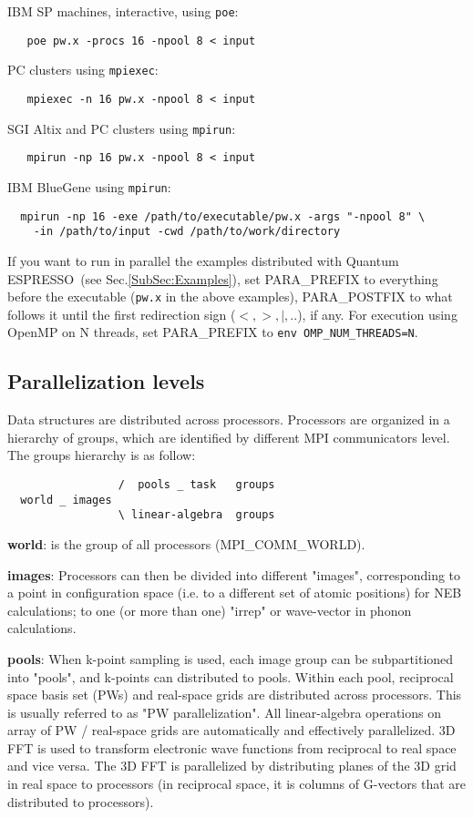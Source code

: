\documentclass[12pt,a4paper]{article}
\def\qe{{\sc Quantum ESPRESSO}}
\def\pw.x{\texttt{pw.x}}
\begin{document}
IBM SP machines, interactive, using \texttt{poe}:
\begin{verbatim}
   poe pw.x -procs 16 -npool 8 < input
\end{verbatim}
PC clusters using \texttt{mpiexec}:
\begin{verbatim}
   mpiexec -n 16 pw.x -npool 8 < input
\end{verbatim}
SGI Altix and PC clusters using \texttt{mpirun}:
\begin{verbatim}   mpirun -np 16 pw.x -npool 8 < input
\end{verbatim}
IBM BlueGene using \texttt{mpirun}:
 \begin{verbatim}
  mpirun -np 16 -exe /path/to/executable/pw.x -args "-npool 8" \
    -in /path/to/input -cwd /path/to/work/directory
\end{verbatim}
If you want to run in parallel the examples distributed with \qe\
(see Sec.\ref{SubSec:Examples}), set PARA\_PREFIX to everything
before the executable (\pw.x in the above examples),
PARA\_POSTFIX to what follows it until the first redirection sign 
($<, >, |,..$), if any. For execution using OpenMP on N threads, 
set  PARA\_PREFIX to \texttt{env OMP\_NUM\_THREADS=N}.

\subsection{Parallelization levels}

Data structures are distributed across processors.
Processors are organized in a hierarchy of groups, 
which are identified by different MPI communicators level.
The groups hierarchy is as follow:
\begin{verbatim}
                 /  pools _ task   groups
  world _ images
                 \ linear-algebra  groups
\end{verbatim}

{\bf world}: is the group of all processors (MPI\_COMM\_WORLD).

{\bf images}: Processors can then be divided into different "images",
corresponding to a point in configuration space (i.e. to
a different set of atomic positions) for NEB calculations;
to one (or more than one) "irrep" or wave-vector in phonon
calculations.

{\bf pools}: When k-point sampling is used, each image group can be 
subpartitioned into "pools", and k-points can distributed to pools.
Within each pool, reciprocal space basis set (PWs)
and real-space grids are distributed across processors.
This is usually referred to as "PW parallelization".
All linear-algebra operations on array of  PW / 
real-space grids are automatically and effectively parallelized.
3D FFT is used to transform electronic wave functions from
reciprocal to real space and vice versa. The 3D FFT is
parallelized by distributing planes of the 3D grid in real
space to processors (in reciprocal space, it is columns of
G-vectors that are distributed to processors). 
\end{document}
